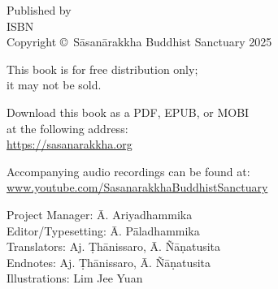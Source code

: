 
\cleartoverso
\thispagestyle{empty}

{%

	\ifafiveversion \fontsize{10}{16}\selectfont \fi
	\ifninebythirteenversion \fontsize{7.5}{11}\selectfont \fi
	\centering
	\setlength{\parindent}{0pt}%

	\ifafiveversion \vspace{0.5cm} \fi
	\ifninebythirteenversion \vspace{0.15cm} \fi

	Published by \publisher\\

	ISBN \theISBN\\
	Copyright \copyright\ Sāsanārakkha Buddhist Sanctuary 2025

	\ifafiveversion \vspace{0.5cm} \fi
	\ifninebythirteenversion \vspace{0.25cm} \fi

	This book is for free distribution only;\\
	it may not be sold.

	\ifafiveversion \vspace{0.5cm} \fi
	\ifninebythirteenversion \vspace{0.25cm} \fi

	Download this book as a PDF, EPUB, or MOBI\\
	at the following address:\\
	\href{https://sasanarakkha.org/}{https://sasanarakkha.org}

	Accompanying audio recordings can be found at: 
	\href{www.youtube.com/SasanarakkhaBuddhistSanctuary}{www.youtube.com/SasanarakkhaBuddhistSanctuary}

	\ifafiveversion \vspace{0.5cm} \fi
	\ifninebythirteenversion \vspace{0.25cm} \fi

	Project Manager: Ā. Ariyadhammika\\
	Editor/Typesetting: Ā. Pāladhammika\\
	Translators: Aj. Ṭhānissaro, Ā. Ñāṇatusita\\
	Endnotes: Aj. Ṭhānissaro, Ā. Ñāṇatusita\\
	Illustrations: Lim Jee Yuan

	\ifafiveversion \vspace{0.5cm} \fi
	\ifninebythirteenversion \vspace{0.25cm} \fi

}
